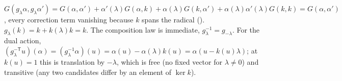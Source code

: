 $G(g_\lambda\alpha, g_\lambda\alpha') = G(\alpha, \alpha') + \alpha'(\lambda)G(\alpha, k) + \alpha(\lambda)G(k, \alpha') + \alpha(\lambda)\alpha'(\lambda)G(k,k) = G(\alpha, \alpha')$, every correction term vanishing because $k$ spans the radical (). $g_\lambda(k) = k + k(\lambda)k = k$. The composition law is immediate, $g_\lambda^{-1} = g_{-\lambda}$. For the dual action, $(g_\lambda^{-\mathsf{T}}u)(\alpha) = (g_\lambda^{-1}\alpha)(u) = \alpha(u) - \alpha(\lambda)k(u) = \alpha(u - k(u)\lambda)$; at $k(u) = 1$ this is translation by $-\lambda$, which is free (no fixed vector for $\lambda \neq 0$) and transitive (any two candidates differ by an element of $\ker k$).
